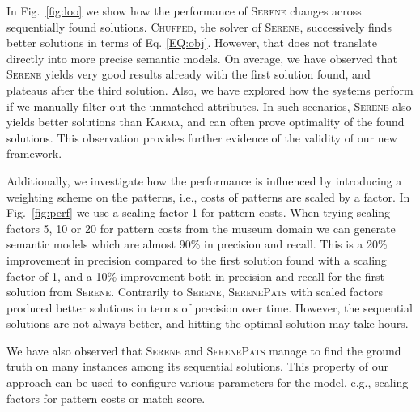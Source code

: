\documentclass[letterpaper]{article} %
\newcommand{\chuffed}{\textsc{Chuffed}}
\newcommand{\karma}{\textsc{Karma}}
\newcommand{\serene}{\textsc{Serene}}
\newcommand{\serenepats}{\textsc{SerenePats}}
\begin{document}
In Fig.~\ref{fig:loo} we show how the performance of \serene{} changes 
across sequentially found solutions.
\chuffed{}, the solver of \serene{}, successively finds better solutions in terms of Eq. \ref{EQ:obj}.
However,
that does not translate directly into more precise semantic models.
On average, we have observed that \serene{} yields very good results already 
with the first solution found, and plateaus after the third solution.
Also, we have explored how the systems perform if we manually filter out the unmatched attributes.
In such scenarios, \serene{} also yields better solutions than \karma{}, and can often prove optimality of the found solutions.
This observation provides further evidence of the validity of our new framework.   

Additionally, we investigate how the performance is influenced by introducing 
a weighting scheme on the patterns, i.e., costs of patterns are scaled by a 
factor.
In Fig.~\ref{fig:perf} we use a scaling factor 1 
for pattern costs.
When trying scaling factors 5, 10 or 20 for pattern costs from the museum 
domain we can generate semantic models which 
are almost 90\% in precision and recall.
This is a 20\% improvement in precision compared to the first solution found 
with a scaling factor of 1, and a 10\% improvement both in precision and recall 
for the first solution from \serene{}.
Contrarily to \serene{}, \serenepats{} with scaled factors produced better 
solutions in terms of precision over time.
However, the sequential solutions are not always better, and hitting the 
optimal solution may take hours.

We have also observed that \serene{} and \serenepats{} manage to find the ground truth on 
many instances among its sequential solutions.
This property of our approach can be used to configure various parameters for the model, e.g., scaling factors for pattern costs or match score.


\end{document}

